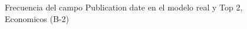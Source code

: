\begin{figure}[H]
    \centering
    
    \caption{Frecuencia del campo Publication date en el modelo real y Top 2, Economicos (B-2)}
    \label{frecuency-Publication Date-top2}
\end{figure}
